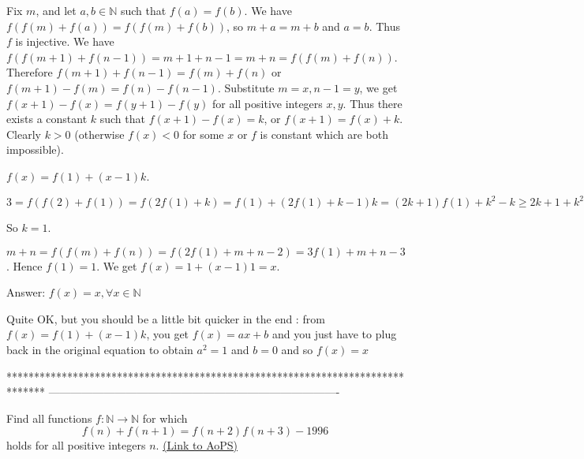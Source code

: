 \begin{solution}
	\begin{tcolorbox}Fix $ m$, and let $ a,b\in\mathbb{N}$ such that $ f(a) = f(b)$. We have $ f(f(m) + f(a)) = f(f(m) + f(b))$, so $ m + a = m + b$ and $ a = b$. Thus $ f$ is injective. We have $ f(f(m + 1) + f(n - 1)) = m + 1 + n - 1 = m + n = f(f(m) + f(n))$. Therefore $ f(m + 1) + f(n - 1) = f(m) + f(n)$ or $ f(m + 1) - f(m) = f(n) - f(n - 1)$. Substitute $ m = x,n - 1 = y$, we get $ f(x + 1) - f(x) = f(y + 1) - f(y)$ for all positive integers $ x,y$. Thus there exists a constant $ k$ such that $ f(x + 1) - f(x) = k$, or $ f(x + 1) = f(x) + k$. Clearly $ k > 0$ (otherwise $ f(x) < 0$ for some $ x$ or $ f$ is constant which are both impossible).

$ f(x) = f(1) + (x - 1)k$.

$ 3 = f(f(2) + f(1)) = f(2f(1) + k) = f(1) + (2f(1) + k - 1)k = (2k + 1)f(1) + k^2 - k\ge 2k + 1 + k^2 - k = k^2 + k + 1$

So $ k = 1$.

$ m + n = f(f(m) + f(n)) = f(2f(1) + m + n - 2) = 3f(1) + m + n - 3$. Hence $ f(1) = 1$. We get $ f(x) = 1 + (x - 1)1 = x$.

Answer: $ \boxed{f(x) = x,\forall x\in\mathbb{N}}$\end{tcolorbox}

Quite OK, but you should be a little bit quicker in the end : from $ f(x) = f(1) + (x - 1)k$, you get $ f(x) = ax + b$ and you just have to plug back in the original equation to obtain $ a^2 = 1$ and $ b = 0$ and so $ f(x) = x$
\end{solution}
*******************************************************************************
-------------------------------------------------------------------------------

\begin{problem}
	Find all functions $f: \mathbb N \to \mathbb N$ for which 
\[ f(n) + f(n+1) = f(n+2)f(n+3)-1996\]
holds for all positive integers $n$.
	\flushright \href{https://artofproblemsolving.com/community/c6h316532}{(Link to AoPS)}
\end{problem}



